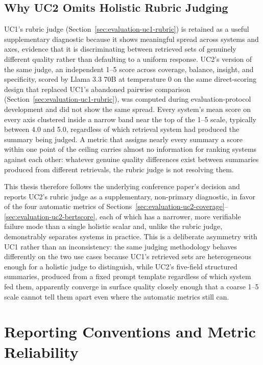 \subsection{Why UC2 Omits Holistic Rubric Judging}
\label{sec:evaluation-uc2-rubric}

UC1's rubric judge (Section~\ref{sec:evaluation-uc1-rubric}) is retained as a useful supplementary
diagnostic because it shows meaningful spread across systems and axes, evidence that it is
discriminating between retrieved sets of genuinely different quality rather than defaulting to a
uniform response. UC2's version of the same judge, an independent 1--5 score across coverage,
balance, insight, and specificity, scored by Llama 3.3 70B at temperature 0 on the same
direct-scoring design that replaced UC1's abandoned pairwise comparison
(Section~\ref{sec:evaluation-uc1-rubric}), was computed during evaluation-protocol development and
did not show the same spread. Every system's mean score on every axis clustered inside a narrow band
near the top of the 1--5 scale, typically between 4.0 and 5.0, regardless of which retrieval system
had produced the summary being judged. A metric that assigns nearly every summary a score within one
point of the ceiling carries almost no information for ranking systems against each other: whatever
genuine quality differences exist between summaries produced from different retrievals, the rubric
judge is not resolving them.

This thesis therefore follows the underlying conference paper's decision and reports UC2's rubric
judge as a supplementary, non-primary diagnostic, in favor of the four automatic metrics of
Sections~\ref{sec:evaluation-uc2-coverage}--\ref{sec:evaluation-uc2-bertscore}, each of which has a
narrower, more verifiable failure mode than a single holistic scalar and, unlike the rubric judge,
demonstrably separates systems in practice. This is a deliberate asymmetry with UC1 rather than an
inconsistency: the same judging methodology behaves differently on the two use cases because UC1's
retrieved sets are heterogeneous enough for a holistic judge to distinguish, while UC2's
five-field structured summaries, produced from a fixed prompt template regardless of which system
fed them, apparently converge in surface quality closely enough that a coarse 1--5 scale cannot tell
them apart even where the automatic metrics still can.

\section{Reporting Conventions and Metric Reliability}
\label{sec:evaluation-reporting}

